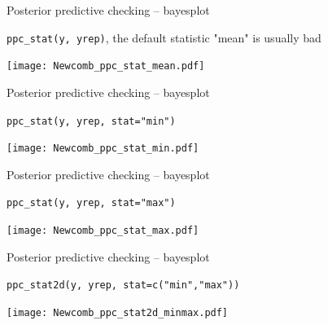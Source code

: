 \documentclass[t]{beamer}
\begin{document}
\begin{frame}{Posterior predictive checking -- bayesplot}

  \vspace{-1\baselineskip}
  \texttt{ppc\_stat(y, yrep)}, the default statistic "mean" is usually bad
  
  \texttt{[image: Newcomb\_ppc\_stat\_mean.pdf]}

\end{frame}

\begin{frame}{Posterior predictive checking -- bayesplot}

  \vspace{-1\baselineskip}
  \texttt{ppc\_stat(y, yrep, stat="min")}
  
  \texttt{[image: Newcomb\_ppc\_stat\_min.pdf]}

\end{frame}

\begin{frame}{Posterior predictive checking -- bayesplot}

  \vspace{-1\baselineskip}
  \texttt{ppc\_stat(y, yrep, stat="max")}
  
  \texttt{[image: Newcomb\_ppc\_stat\_max.pdf]}

\end{frame}

\begin{frame}{Posterior predictive checking -- bayesplot}

  \vspace{-1\baselineskip}
  \texttt{ppc\_stat2d(y, yrep, stat=c("min","max"))}
  
  \texttt{[image: Newcomb\_ppc\_stat2d\_minmax.pdf]}

\end{frame}



\end{document}
